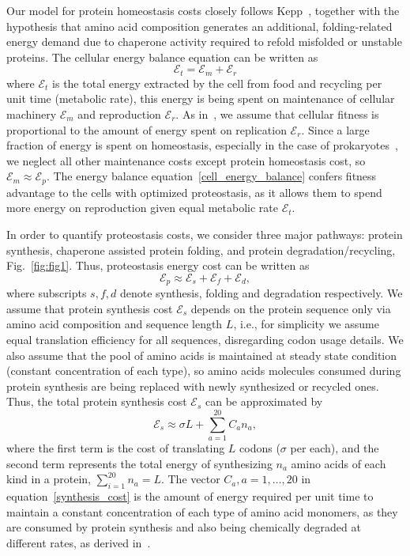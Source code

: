 \documentclass[10pt,letterpaper]{article}
\begin{document}
Our model for protein homeostasis costs closely follows Kepp~\cite{Kepp2014Model}, together with the hypothesis that amino acid composition generates an additional, folding-related energy demand due to chaperone activity required to refold misfolded or unstable proteins. The cellular energy balance equation can be written as
\begin{equation}
	\label{cell_energy_balance}
	\mathcal{E}_{t} = \mathcal{E}_{m} + \mathcal{E}_{r}
\end{equation}
where $\mathcal{E}_{t}$ is the total energy extracted by the cell from food and recycling per unit time (metabolic rate), this energy is being spent on maintenance of cellular machinery $\mathcal{E}_{m}$ and reproduction $\mathcal{E}_{r}$. As in~\cite{Kepp2014Model}, we assume that cellular fitness is proportional to the amount of energy spent on replication $\mathcal{E}_{r}$.  Since a large fraction of energy is spent on homeostasis, especially in the case of prokaryotes~\cite{Harold1987Vital}, we neglect all other maintenance costs except protein homeostasis cost, so $\mathcal{E}_{m}\approx\mathcal{E}_{p}$.
The energy balance equation~\eqref{cell_energy_balance} confers fitness advantage to the cells with optimized proteostasis, as it allows them to spend more energy on reproduction given equal metabolic rate $\mathcal{E}_{t}$. 

In order to quantify proteostasis costs, we consider three major pathways: protein synthesis, chaperone assisted protein folding, and protein degradation/recycling,  Fig.~\ref{fig:fig1}. Thus, proteostasis energy cost can be written as
\begin{equation}
	\label{proteostasis_cost_expansion}
	\mathcal{E}_{p} \approx \mathcal{E}_{s} + \mathcal{E}_{f} + \mathcal{E}_{d},
\end{equation}
where subscripts $s,f,d$ denote synthesis, folding and degradation respectively. We assume that protein synthesis cost $\mathcal{E}_{s}$ depends on the protein sequence only via amino acid composition and sequence length $L$, i.e., for simplicity we assume equal translation efficiency for all sequences, disregarding codon usage details. We also assume that the pool of amino acids is maintained at steady state condition (constant concentration of each type), so amino acids molecules consumed during protein synthesis are being replaced with newly synthesized or recycled ones. Thus, the total protein synthesis cost $\mathcal{E}_{s}$ can be approximated by
\begin{equation}
	\label{synthesis_cost}
	\mathcal{E}_{s} \approx \sigma L + \sum\limits_{a=1}^{20}C_{a}n_{a},
\end{equation}
where the first term is the cost of translating $L$ codons ($\sigma$ per each), and the second term represents the total energy of synthesizing $n_{a}$ amino acids of each kind in a protein, $\sum\limits_{i=1}^{20}n_{a} = L$. The vector $C_{a}, a=1,\dots,20$ in equation~\eqref{synthesis_cost} is the amount of energy required per unit time to maintain a constant concentration of each type of amino acid monomers, as they are consumed by protein synthesis and also being chemically degraded at different rates, as derived in~\cite{Krick2014Amino}. 
 
\end{document}
